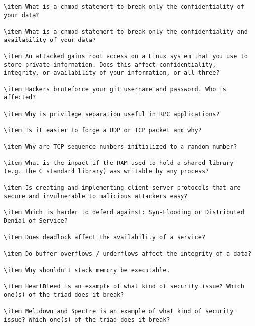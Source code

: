 \begin{lstlisting}
\item What is a chmod statement to break only the confidentiality of your data?

\item What is a chmod statement to break only the confidentiality and availability of your data?

\item An attacked gains root access on a Linux system that you use to store private information. Does this affect confidentiality, integrity, or availability of your information, or all three?

\item Hackers bruteforce your git username and password. Who is affected?

\item Why is privilege separation useful in RPC applications?

\item Is it easier to forge a UDP or TCP packet and why? 

\item Why are TCP sequence numbers initialized to a random number?

\item What is the impact if the RAM used to hold a shared library (e.g. the C standard library) was writable by any process?

\item Is creating and implementing client-server protocols that are secure and invulnerable to malicious attackers easy?

\item Which is harder to defend against: Syn-Flooding or Distributed Denial of Service?

\item Does deadlock affect the availability of a service?

\item Do buffer overflows / underflows affect the integrity of a data?

\item Why shouldn't stack memory be executable.

\item HeartBleed is an example of what kind of security issue? Which one(s) of the triad does it break?

\item Meltdown and Spectre is an example of what kind of security issue? Which one(s) of the triad does it break?

\end{lstlisting}



